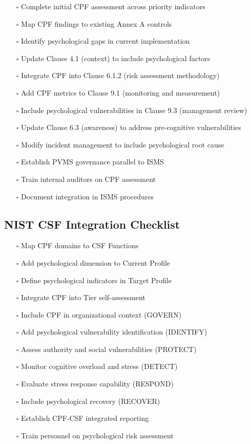 \documentclass[11pt,a4paper]{article}
\begin{document}
\begin{enumerate}
\item[$\square$] Complete initial CPF assessment across priority indicators
\item[$\square$] Map CPF findings to existing Annex A controls
\item[$\square$] Identify psychological gaps in current implementation
\item[$\square$] Update Clause 4.1 (context) to include psychological factors
\item[$\square$] Integrate CPF into Clause 6.1.2 (risk assessment methodology)
\item[$\square$] Add CPF metrics to Clause 9.1 (monitoring and measurement)
\item[$\square$] Include psychological vulnerabilities in Clause 9.3 (management review)
\item[$\square$] Update Clause 6.3 (awareness) to address pre-cognitive vulnerabilities
\item[$\square$] Modify incident management to include psychological root cause
\item[$\square$] Establish PVMS governance parallel to ISMS
\item[$\square$] Train internal auditors on CPF assessment
\item[$\square$] Document integration in ISMS procedures
\end{enumerate}

\subsection{NIST CSF Integration Checklist}

\begin{enumerate}
\item[$\square$] Map CPF domains to CSF Functions
\item[$\square$] Add psychological dimension to Current Profile
\item[$\square$] Define psychological indicators in Target Profile
\item[$\square$] Integrate CPF into Tier self-assessment
\item[$\square$] Include CPF in organizational context (GOVERN)
\item[$\square$] Add psychological vulnerability identification (IDENTIFY)
\item[$\square$] Assess authority and social vulnerabilities (PROTECT)
\item[$\square$] Monitor cognitive overload and stress (DETECT)
\item[$\square$] Evaluate stress response capability (RESPOND)
\item[$\square$] Include psychological recovery (RECOVER)
\item[$\square$] Establish CPF-CSF integrated reporting
\item[$\square$] Train personnel on psychological risk assessment
\end{enumerate}
\end{document}
